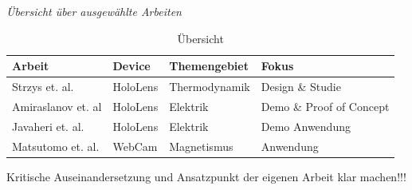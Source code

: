 \vspace{4px}
\textit{Übersicht über ausgewählte Arbeiten}\\
\begin{table}[htb]
	\centering
	\begin{tabular}{l|l|l|l}
		Arbeit & Device & Themengebiet & Fokus\\
		\hline
		\hline
		Strzys et. al. & HoloLens & Thermodynamik & Design \& Studie\\
		\hline
		Amiraslanov et. al & HoloLens & Elektrik & Demo \& Proof of Concept\\
		\hline
		Javaheri et. al. & HoloLens & Elektrik & Demo Anwendung\\
		\hline
		Matsutomo et. al. & WebCam & Magnetismus & Anwendung\\
	\end{tabular}\caption{\label{tab:comparioson} Übersicht}
\end{table}
Kritische Auseinandersetzung und Ansatzpunkt der eigenen Arbeit klar machen!!!

\nocite{Lebeck16}